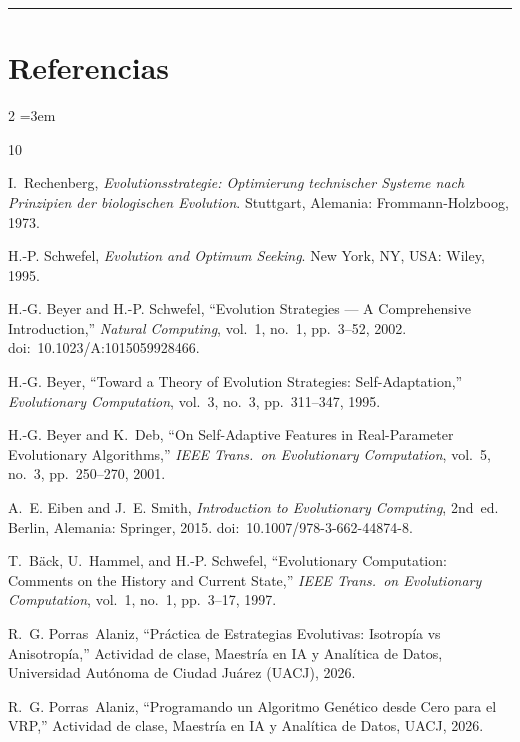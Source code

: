 \documentclass[12pt,letterpaper]{article}
\begin{document}
\vspace{1em}
{\color{uacjgray}\hrule}
\vspace{1em}

\newpage
\section*{Referencias}

\begingroup
\renewcommand{\section}[2]{}
\begin{multicols}{2}
\small
\emergencystretch=3em
\begin{thebibliography}{10}

I.~Rechenberg, \textit{Evolutionsstrategie: Optimierung technischer Systeme nach Prinzipien der biologischen Evolution}. Stuttgart, Alemania: Frommann-Holzboog, 1973.

H.-P. Schwefel, \textit{Evolution and Optimum Seeking}. New York, NY, USA: Wiley, 1995.

H.-G. Beyer and H.-P. Schwefel, ``Evolution Strategies --- A Comprehensive Introduction,'' \textit{Natural Computing}, vol.~1, no.~1, pp.~3--52, 2002. doi:~10.1023/A:1015059928466.

H.-G. Beyer, ``Toward a Theory of Evolution Strategies: Self-Adaptation,'' \textit{Evolutionary Computation}, vol.~3, no.~3, pp.~311--347, 1995.

H.-G. Beyer and K.~Deb, ``On Self-Adaptive Features in Real-Parameter Evolutionary Algorithms,'' \textit{IEEE Trans.\ on Evolutionary Computation}, vol.~5, no.~3, pp.~250--270, 2001.

A.~E. Eiben and J.~E. Smith, \textit{Introduction to Evolutionary Computing}, 2nd~ed. Berlin, Alemania: Springer, 2015. doi:~10.1007/978-3-662-44874-8.

T.~Bäck, U.~Hammel, and H.-P. Schwefel, ``Evolutionary Computation: Comments on the History and Current State,'' \textit{IEEE Trans.\ on Evolutionary Computation}, vol.~1, no.~1, pp.~3--17, 1997.

R.~G. Porras~Alaniz, ``Práctica de Estrategias Evolutivas: Isotropía vs Anisotropía,'' Actividad de clase, Maestría en IA y Analítica de Datos, Universidad Autónoma de Ciudad Juárez (UACJ), 2026.

R.~G. Porras~Alaniz, ``Programando un Algoritmo Genético desde Cero para el VRP,'' Actividad de clase, Maestría en IA y Analítica de Datos, UACJ, 2026.

\end{thebibliography}
\end{multicols}
\endgroup
\end{document}
